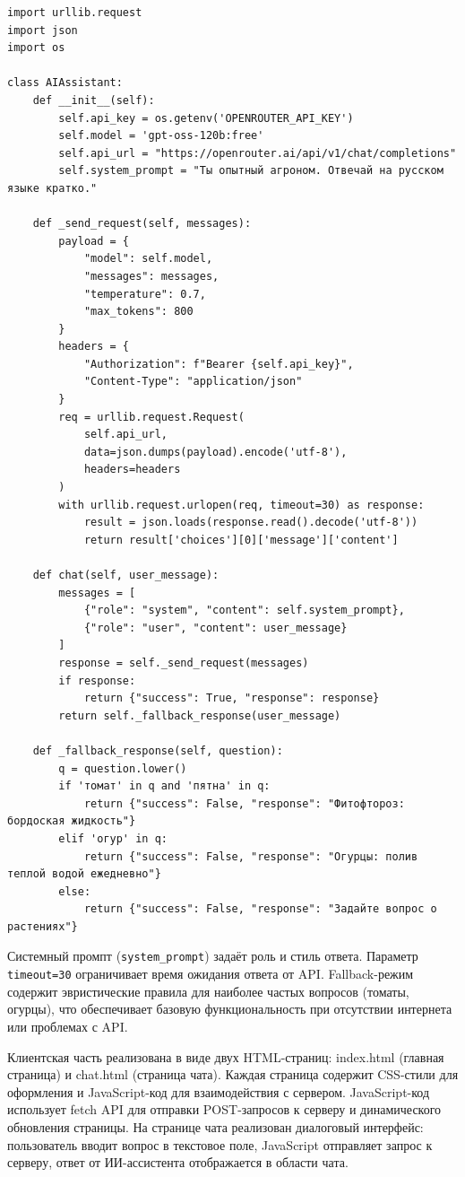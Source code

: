 \documentclass[14pt, a4paper]{extarticle}
\begin{document}
\begin{verbatim}
import urllib.request
import json
import os

class AIAssistant:
    def __init__(self):
        self.api_key = os.getenv('OPENROUTER_API_KEY')
        self.model = 'gpt-oss-120b:free'
        self.api_url = "https://openrouter.ai/api/v1/chat/completions"
        self.system_prompt = "Ты опытный агроном. Отвечай на русском языке кратко."
    
    def _send_request(self, messages):
        payload = {
            "model": self.model,
            "messages": messages,
            "temperature": 0.7,
            "max_tokens": 800
        }
        headers = {
            "Authorization": f"Bearer {self.api_key}",
            "Content-Type": "application/json"
        }
        req = urllib.request.Request(
            self.api_url,
            data=json.dumps(payload).encode('utf-8'),
            headers=headers
        )
        with urllib.request.urlopen(req, timeout=30) as response:
            result = json.loads(response.read().decode('utf-8'))
            return result['choices'][0]['message']['content']
    
    def chat(self, user_message):
        messages = [
            {"role": "system", "content": self.system_prompt},
            {"role": "user", "content": user_message}
        ]
        response = self._send_request(messages)
        if response:
            return {"success": True, "response": response}
        return self._fallback_response(user_message)
    
    def _fallback_response(self, question):
        q = question.lower()
        if 'томат' in q and 'пятна' in q:
            return {"success": False, "response": "Фитофтороз: бордоская жидкость"}
        elif 'огур' in q:
            return {"success": False, "response": "Огурцы: полив теплой водой ежедневно"}
        else:
            return {"success": False, "response": "Задайте вопрос о растениях"}
\end{verbatim}

    Системный промпт (\texttt{system\_prompt}) задаёт роль и стиль ответа. Параметр \texttt{timeout=30} ограничивает время ожидания ответа от API. Fallback-режим содержит эвристические правила для наиболее частых вопросов (томаты, огурцы), что обеспечивает базовую функциональность при отсутствии интернета или проблемах с API.

    Клиентская часть реализована в виде двух HTML-страниц: index.html (главная страница) и chat.html (страница чата). Каждая страница содержит CSS-стили для оформления и JavaScript-код для взаимодействия с сервером. JavaScript-код использует fetch API для отправки POST-запросов к серверу и динамического обновления страницы. На странице чата реализован диалоговый интерфейс: пользователь вводит вопрос в текстовое поле, JavaScript отправляет запрос к серверу, ответ от ИИ-ассистента отображается в области чата.
\end{document}
